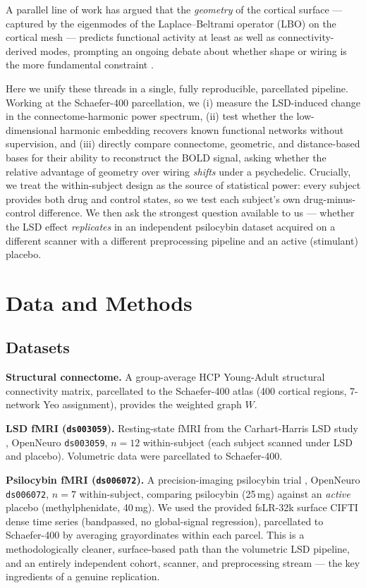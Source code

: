 \documentclass[10pt,a4paper]{article}
\begin{document}
A parallel line of work \cite{pang2023} has argued that the \emph{geometry}
of the cortical surface --- captured by the eigenmodes of the Laplace--Beltrami
operator (LBO) on the cortical mesh --- predicts functional activity at least as
well as connectivity-derived modes, prompting an ongoing debate about whether
shape or wiring is the more fundamental constraint \cite{mansour2024}.

Here we unify these threads in a single, fully reproducible, parcellated pipeline.
Working at the Schaefer-400 parcellation, we (i) measure the LSD-induced change in
the connectome-harmonic power spectrum, (ii) test whether the low-dimensional
harmonic embedding recovers known functional networks without supervision, and
(iii) directly compare connectome, geometric, and distance-based bases for their
ability to reconstruct the BOLD signal, asking whether the relative advantage of
geometry over wiring \emph{shifts} under a psychedelic. Crucially, we treat the
within-subject design as the source of statistical power: every subject provides
both drug and control states, so we test each subject's own drug-minus-control
difference. We then ask the strongest question available to us --- whether the
LSD effect \emph{replicates} in an independent psilocybin dataset acquired on a
different scanner with a different preprocessing pipeline and an active
(stimulant) placebo.

\section{Data and Methods}

\subsection{Datasets}
\textbf{Structural connectome.} A group-average HCP Young-Adult structural
connectivity matrix, parcellated to the Schaefer-400 atlas (400 cortical
regions, 7-network Yeo assignment), provides the weighted graph $W$.

\textbf{LSD fMRI (\texttt{ds003059}).} Resting-state fMRI from the Carhart-Harris
LSD study \cite{carharthtarris2020}, OpenNeuro \texttt{ds003059}, $n=12$
within-subject (each subject scanned under LSD and placebo). Volumetric data were
parcellated to Schaefer-400.

\textbf{Psilocybin fMRI (\texttt{ds006072}).} A precision-imaging psilocybin trial
\cite{siegel2025}, OpenNeuro \texttt{ds006072}, $n=7$ within-subject, comparing
psilocybin (25\,mg) against an \emph{active} placebo (methylphenidate, 40\,mg).
We used the provided fsLR-32k surface CIFTI dense time series (bandpassed, no
global-signal regression), parcellated to Schaefer-400 by averaging grayordinates
within each parcel. This is a methodologically cleaner, surface-based path than
the volumetric LSD pipeline, and an entirely independent cohort, scanner, and
preprocessing stream --- the key ingredients of a genuine replication.
\end{document}
